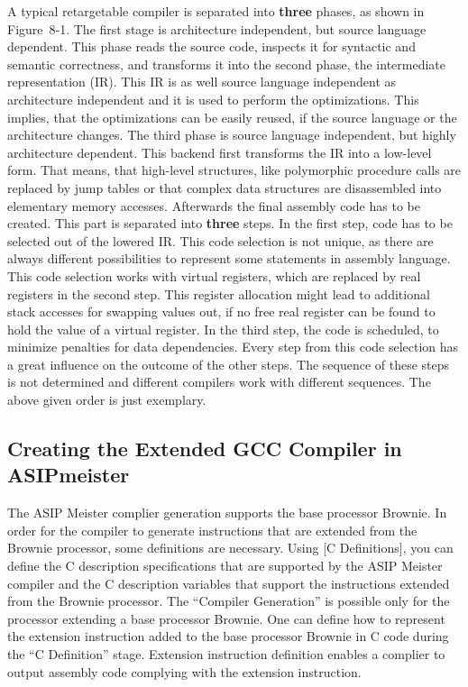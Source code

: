 \documentclass[
]{article}
\begin{document}
A typical retargetable compiler is separated into \textbf{three} phases,
as shown in Figure~8‑1. The first stage is architecture independent, but
source language dependent. This phase reads the source code, inspects it
for syntactic and semantic correctness, and transforms it into the
second phase, the intermediate representation (IR). This IR is as well
source language independent as architecture independent and it is used
to perform the optimizations. This implies, that the optimizations can
be easily reused, if the source language or the architecture changes.
The third phase is source language independent, but highly architecture
dependent. This backend first transforms the IR into a low-level form.
That means, that high-level structures, like polymorphic procedure calls
are replaced by jump tables or that complex data structures are
disassembled into elementary memory accesses. Afterwards the final
assembly code has to be created. This part is separated into
\textbf{three} steps. In the first step, code has to be selected out of
the lowered IR. This code selection is not unique, as there are always
different possibilities to represent some statements in assembly
language. This code selection works with virtual registers, which are
replaced by real registers in the second step. This register allocation
might lead to additional stack accesses for swapping values out, if no
free real register can be found to hold the value of a virtual register.
In the third step, the code is scheduled, to minimize penalties for data
dependencies. Every step from this code selection has a great influence
on the outcome of the other steps. The sequence of these steps is not
determined and different compilers work with different sequences. The
above given order is just exemplary.

\hypertarget{creating-the-extended-gcc-compiler-in-asipmeister}{%
\subsection{Creating the Extended GCC Compiler in
ASIPmeister}\label{creating-the-extended-gcc-compiler-in-asipmeister}}

The ASIP Meister complier generation supports the base processor
Brownie. In order for the compiler to generate instructions that are
extended from the Brownie processor, some definitions are necessary.
Using {[}C Definitions{]}, you can define the C description
specifications that are supported by the ASIP Meister compiler and the C
description variables that support the instructions extended from the
Brownie processor. The ``Compiler Generation'' is possible only for the
processor extending a base processor Brownie. One can define how to
represent the extension instruction added to the base processor Brownie
in C code during the ``C Definition'' stage. Extension instruction
definition enables a complier to output assembly code complying with the
extension instruction.
\end{document}
